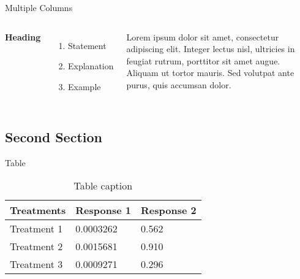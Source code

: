 \documentclass[aspectratio=169,xcolor=dvipsnames]{beamer}
\begin{document}

\begin{frame}{Multiple Columns}
    \begin{columns}[c] %

        \textbf{Heading}
        \begin{enumerate}
            \item Statement
            \item Explanation
            \item Example
        \end{enumerate}

        Lorem ipsum dolor sit amet, consectetur adipiscing elit. Integer lectus nisl, ultricies in feugiat rutrum, porttitor sit amet augue. Aliquam ut tortor mauris. Sed volutpat ante purus, quis accumsan dolor.

    \end{columns}
\end{frame}

\subsection{Second Section}

\begin{frame}{Table}
    \begin{table}
        \begin{tabular}{l l l}
            \toprule
            \textbf{Treatments} & \textbf{Response 1} & \textbf{Response 2} \\
            \midrule
            Treatment 1         & 0.0003262           & 0.562               \\
            Treatment 2         & 0.0015681           & 0.910               \\
            Treatment 3         & 0.0009271           & 0.296               \\
            \bottomrule
        \end{tabular}
        \caption{Table caption}
    \end{table}
\end{frame}

\end{document}
